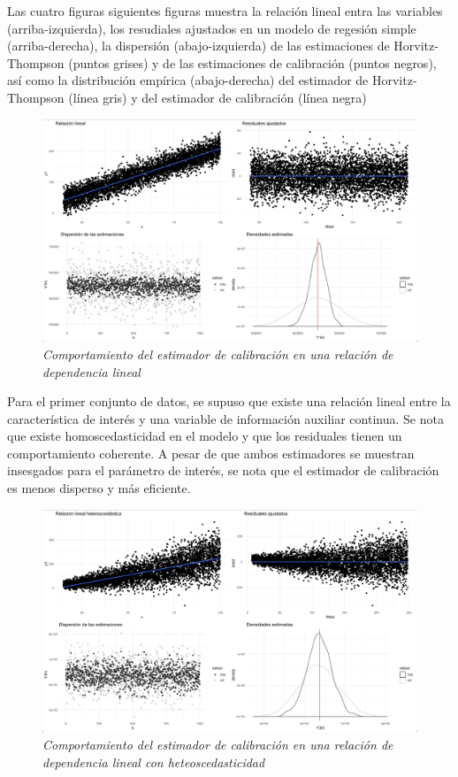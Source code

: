 \documentclass[
  10pt,
  spanish,
]{book}
\begin{document}
Las cuatro figuras siguientes figuras muestra la relación lineal entra las variables (arriba-izquierda), los resudiales ajustados en un modelo de regesión simple (arriba-derecha), la dispersión (abajo-izquierda) de las estimaciones de Horvitz-Thompson (puntos grises) y de las estimaciones de calibración (puntos negros), así como la distribución empírica (abajo-derecha) del estimador de Horvitz-Thompson (línea gris) y del estimador de calibración (línea negra)

\begin{figure}
\centering
\includegraphics{Pics/c5.png}
\caption{\emph{Comportamiento del estimador de calibración en una relación de dependencia lineal}}
\end{figure}

Para el primer conjunto de datos, se supuso que existe una relación lineal entre la característica de interés y una variable de información auxiliar continua. Se nota que existe homoscedasticidad en el modelo y que los residuales tienen un comportamiento coherente. A pesar de que ambos estimadores se muestran insesgados para el parámetro de interés, se nota que el estimador de calibración es menos disperso y más eficiente.

\begin{figure}
\centering
\includegraphics{Pics/c6.png}
\caption{\emph{Comportamiento del estimador de calibración en una relación de dependencia lineal con heteoscedasticidad}}
\end{figure}
\end{document}
